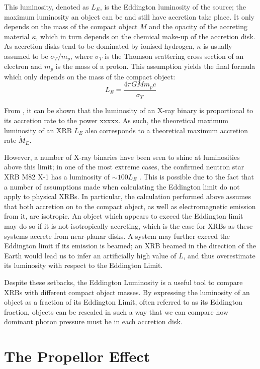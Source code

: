 This luminosity, denoted as $L_E$, is the Eddington luminosity of the source; the maximum luminosity an object can be and still have accretion take place.  It only depends on the mass of the compact object $M$ and the opacity of the accreting material $\kappa$, which in turn depends on the chemical make-up of the accretion disk.  As accretion disks tend to be dominated by ionised hydrogen, $\kappa$ is usually assumed to be $\sigma_T/m_p$, where $\sigma_T$ is the Thomson scattering cross section of an electron and $m_p$ is the mass of a proton.  This assumption yields the final formula which only depends on the mass of the compact object:
\begin{equation}
L_E=\frac{4\pi GMm_pc}{\sigma_T}
\end{equation}
\par From \citet{Shakura_Disk}, it can be shown that the luminosity of an X-ray binary is proportional to its accretion rate to the power xxxxx.  As such, the theoretical maximum luminosity of an XRB $L_E$ also corresponds to a theoretical maximum accretion rate $\dot{M}_E$.
\par However, a number of X-ray binaries have been seen to shine at luminosities above this limit; in one of the most extreme cases, the confirmed neutron star XRB M82 X-1 has a luminosity of $\sim100L_E$ \citep{Bachetti_M82X1}.  This is possible due to the fact that a number of assumptions made when calculating the Eddington limit do not apply to physical XRBs.  In particular, the calculation performed above assumes that both accretion on to the compact object, as well as electromagnetic emission from it, are isotropic.  An object which appears to exceed the Eddington limit may do so if it is not isotropically accreting, which is the case for XRBs as these systems accrete from near-planar disks.  A system may further exceed the Eddington limit if its emission is beamed; an XRB beamed in the direction of the Earth would lead us to infer an artificially high value of $L$, and thus overestimate its luminosity with respect to the Eddington Limit.
\par Despite these setbacks, the Eddington Luminosity is a useful tool to compare XRBs with different compact object masses.  By expressing the luminosity of an object as a fraction of its Eddington Limit, often referred to as its Eddington fraction, objects can be rescaled in such a way that we can compare how dominant photon pressure must be in each accretion disk.

\section{The Propellor Effect}

